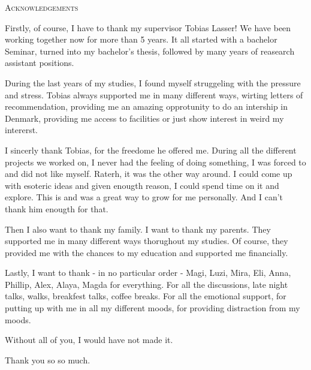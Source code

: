 \thispagestyle{empty}
\begin{center}
  \textsc{Acknowledgements}
\end{center}

\noindent
%
Firstly, of course, I have to thank my supervisor Tobias Lasser! We have been working together now
for more than 5 years. It all started with a bachelor Seminar, turned into my bachelor's thesis,
followed by many years of reasearch assistant positions. 
 
During the last years of my studies, I found myself struggeling with the pressure and stress.
Tobias always supported me in many different ways, wirting letters of recommendation, providing me
an amazing opprotunity to do an intership in Denmark, providing me access to facilities or just
show interest in weird my intererst.

I sincerly thank Tobias, for the freedome he offered me. During all the different projects we worked on,
I never had the feeling of doing something, I was forced to and did not like myself.
Raterh, it was the other way around. I could come up with esoteric ideas and given enougth reason, 
I could spend time on it and explore. This is and was a great way to grow for me personally. And 
I can't thank him enougth for that.

Then I also want to thank my family. I want to thank my parents. They supported me in many different
ways thorughout my studies. Of course, they provided me with the chances to my education and
supported me financially.

Lastly, I want to thank - in no particular order - Magi, Luzi, Mira, Eli, Anna, Phillip, Alex, Alaya,
Magda for everything. For all the discussions, late night talks, walks, breakfest talks, coffee breaks.
For all the emotional support, for putting up with me in all my different moods, for providing
distraction from my moods.
 
Without all of you, I would have not made it.

\begin{flushleft}
  Thank you so so much.
\end{flushleft}
